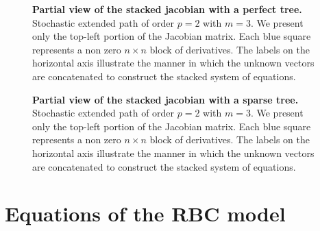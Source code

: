 \documentclass[a4paper,11pt]{amsart}
\begin{document}
\begin{figure}[H]
   \centering
   \hspace*{-0.8cm}\scalebox{.85}{}
   \caption{\textbf{Partial view of the stacked jacobian with a perfect tree.} Stochastic extended path of order $p=2$ with $m=3$. We present only the top-left portion of the Jacobian matrix. Each blue square represents a non zero $n\times n$ block of derivatives. The labels on the horizontal axis illustrate the manner in which the unknown vectors are concatenated to construct the stacked system of equations.}
   \label{fig:jacobian:perfect-tree}
\end{figure}


\begin{figure}[H]
   \centering
   \hspace*{-0.4cm}\scalebox{.85}{}
   \caption{\textbf{Partial view of the stacked jacobian with a sparse tree.} Stochastic extended path of order $p=2$ with $m=3$. We present only the top-left portion of the Jacobian matrix. Each blue square represents a non zero $n\times n$ block of derivatives. The labels on the horizontal axis illustrate the manner in which the unknown vectors are concatenated to construct the stacked system of equations.}
   \label{fig:jacobian:sparse-tree}
\end{figure}



\newpage

\setcounter{equation}{0}
\renewcommand{\theequation}{\thesection.\arabic{equation}}


\section{Equations of the RBC model}\label{appendix:rbc}
\setcounter{equation}{0}
\end{document}
